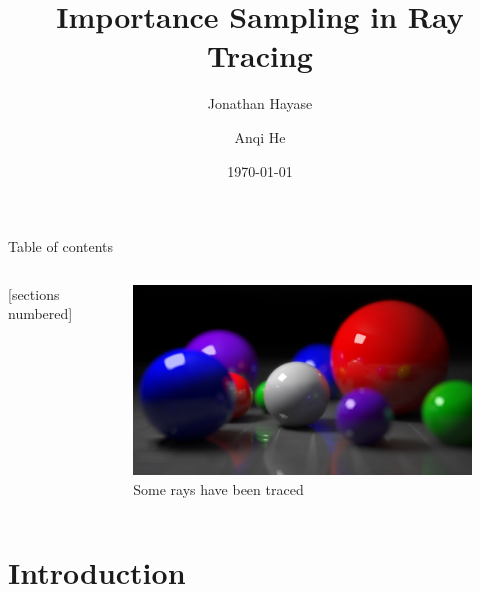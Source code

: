 \documentclass[10pt]{beamer}
\title{Importance Sampling in Ray Tracing}
\subtitle{}
\date{\today}
\author{Jonathan Hayase \and Anqi He}
\institute{Math 164 -- Scientific Computing -- Spring 2018}
\begin{document}
\maketitle

\begin{frame}{Table of contents}
  \begin{columns}
    [sections numbered]
    \tableofcontents[hideallsubsections]

    \begin{figure}[H]
      \centering
      \includegraphics[width=\linewidth]{raytracing_example.png}
      \caption{Some rays have been traced}
    \end{figure}
  \end{columns}
\end{frame}

\section{Introduction}
\end{document}
